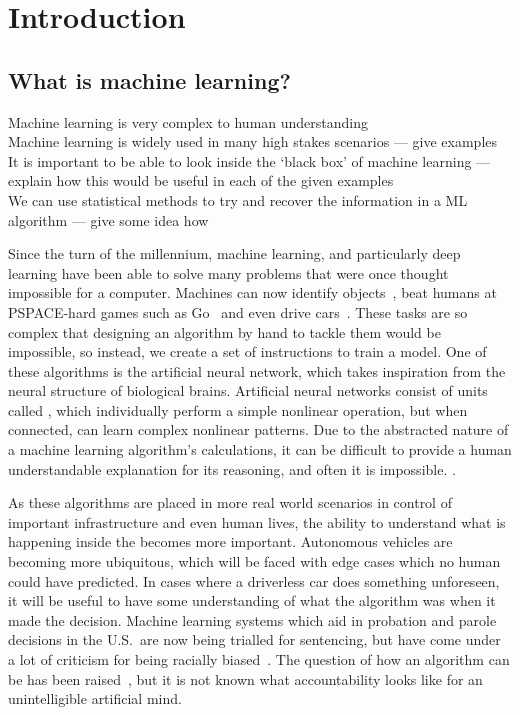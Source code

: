 
\chapter{Introduction}

\section{What is machine learning?}
\begin{todo}
	Machine learning is very complex to human understanding \\
	Machine learning is widely used in many high stakes scenarios --- give examples \\
	It is important to be able to look inside the `black box' of machine learning --- explain how this would be useful in each of the given examples \\
	We can use statistical methods to try and recover the information in a ML algorithm --- give some idea how
\end{todo}
   
    

Since the turn of the millennium, machine learning, and particularly deep learning have been able to solve many problems that were once thought impossible for a computer.
Machines can now identify objects~\autocite{li2018}, beat humans at PSPACE-hard games such as Go~\autocite{chao2018} and even drive cars~\autocite{gerla2014}.
These tasks are so complex that designing an algorithm by hand to tackle them would be impossible, so instead, we create a set of instructions to train a model.
One of these  algorithms is the artificial neural network, which takes inspiration from the neural structure of biological brains.
Artificial neural networks consist of units called , which individually perform a simple nonlinear operation, but when connected, can learn complex nonlinear patterns.
Due to the abstracted nature of a machine learning algorithm's calculations, it can be difficult to provide a human understandable explanation for its reasoning, and often it is impossible.
.

As these algorithms are placed in more real world scenarios in control of important infrastructure and even human lives, the ability to understand what is happening inside the  becomes more important.
Autonomous vehicles are becoming more ubiquitous, which will be faced with edge cases which no human could have predicted.
In cases where a driverless car does something unforeseen, it will be useful to have some understanding of what the algorithm was  when it made the decision.
Machine learning systems which aid in probation and parole decisions in the U.S.\ are now being trialled for sentencing, but have come under a lot of criticism for being racially biased~\autocite{christin2015}.
The question of how an algorithm can be  has been raised~\autocite[9]{christin2015}, but it is not known what accountability looks like for an unintelligible artificial mind.
